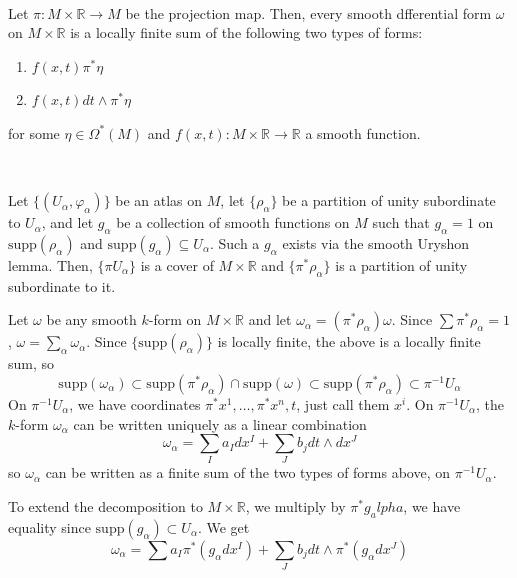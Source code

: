 \documentclass{article}
\begin{document}
\begin{proposition}
\

Let $\pi: M \times \mathbb{R} \to M$ be the projection map. Then, every smooth dfferential form $\omega$ on $M \times \mathbb{R}$ is a locally finite sum of the following two types of forms:

\begin{enumerate}
  \item $f(x,t)\pi^*\eta$
  \item $f(x,t) dt \wedge \pi^*\eta$
\end{enumerate}for some $\eta \in \Omega^*(M)$ and $f(x,t): M \times \mathbb{R} \to \mathbb{R}$ a smooth function.
\end{proposition}

\begin{customproof}
\

Let $\{(U_\alpha, \varphi_\alpha)\}$ be an atlas on $M$, let $\{\rho_\alpha\}$ be a partition of unity subordinate to $U_\alpha$, and let $g_\alpha$ be a collection of smooth functions on $M$ such that $g_\alpha = 1$ on $\text{supp}(\rho_\alpha)$ and $\text{supp}(g_\alpha) \subseteq U_\alpha$. Such a $g_\alpha$ exists via the smooth Uryshon lemma. Then, $\{\pi U_\alpha\}$ is a cover of $M \times \mathbb{R}$ and $\{\pi^* \rho_\alpha\}$ is a partition of unity subordinate to it. 

Let $\omega$ be any smooth $k$-form on $M \times \mathbb{R}$ and let $\omega_\alpha = (\pi^*\rho_\alpha) \omega$. Since $\sum \pi^* \rho_\alpha = 1$, $\omega = \sum_{\alpha} \omega_\alpha$. Since $\{\text{supp} (\rho_\alpha)\}$ is locally finite, the above is a locally finite sum, so $$\text{supp}(\omega_\alpha) \subset \text{supp}(\pi^*\rho_\alpha) \cap \text{supp}(\omega) \subset \text{supp}(\pi^*\rho_\alpha) \subset \pi ^{-1}U_\alpha$$On $\pi ^{-1}U_\alpha$, we have coordinates $\pi^*x^1, \dots, \pi^*x^n, t$, just call them $x^i$. On $\pi ^{-1}U_\alpha$, the $k$-form $\omega_\alpha$ can be written uniquely as a linear combination $$\omega_\alpha = \sum_I a_Idx^I + \sum_J b_jdt \wedge dx^J$$so $\omega_\alpha$ can be written as a finite sum of the two types of forms above, on $\pi ^{-1}U_\alpha$.

To extend the decomposition to $M \times \mathbb{R}$, we multiply by $\pi^*g_alpha$, we have equality since $\text{supp}(g_\alpha) \subset U_\alpha$. We get $$\omega_\alpha = \sum a_I \pi^*(g_\alpha dx^I) + \sum_J b_jdt\wedge \pi^*(g_\alpha dx^J)$$
\end{customproof}
\end{document}
